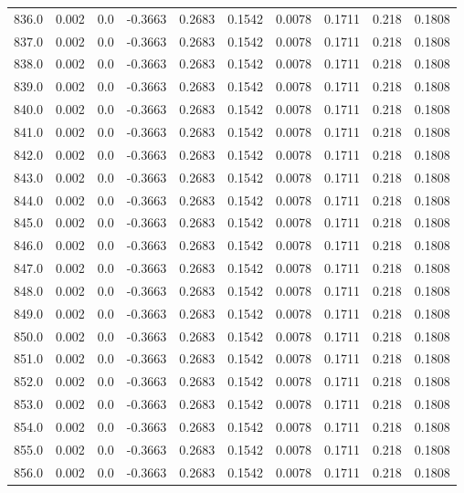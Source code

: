 \begin{longtable}{lrrrrrrrrr}
836.0 & 0.002 & 0.0 & -0.3663 & 0.2683 & 0.1542 & 0.0078 & 0.1711 & 0.218 & 0.1808 \\
837.0 & 0.002 & 0.0 & -0.3663 & 0.2683 & 0.1542 & 0.0078 & 0.1711 & 0.218 & 0.1808 \\
838.0 & 0.002 & 0.0 & -0.3663 & 0.2683 & 0.1542 & 0.0078 & 0.1711 & 0.218 & 0.1808 \\
839.0 & 0.002 & 0.0 & -0.3663 & 0.2683 & 0.1542 & 0.0078 & 0.1711 & 0.218 & 0.1808 \\
840.0 & 0.002 & 0.0 & -0.3663 & 0.2683 & 0.1542 & 0.0078 & 0.1711 & 0.218 & 0.1808 \\
841.0 & 0.002 & 0.0 & -0.3663 & 0.2683 & 0.1542 & 0.0078 & 0.1711 & 0.218 & 0.1808 \\
842.0 & 0.002 & 0.0 & -0.3663 & 0.2683 & 0.1542 & 0.0078 & 0.1711 & 0.218 & 0.1808 \\
843.0 & 0.002 & 0.0 & -0.3663 & 0.2683 & 0.1542 & 0.0078 & 0.1711 & 0.218 & 0.1808 \\
844.0 & 0.002 & 0.0 & -0.3663 & 0.2683 & 0.1542 & 0.0078 & 0.1711 & 0.218 & 0.1808 \\
845.0 & 0.002 & 0.0 & -0.3663 & 0.2683 & 0.1542 & 0.0078 & 0.1711 & 0.218 & 0.1808 \\
846.0 & 0.002 & 0.0 & -0.3663 & 0.2683 & 0.1542 & 0.0078 & 0.1711 & 0.218 & 0.1808 \\
847.0 & 0.002 & 0.0 & -0.3663 & 0.2683 & 0.1542 & 0.0078 & 0.1711 & 0.218 & 0.1808 \\
848.0 & 0.002 & 0.0 & -0.3663 & 0.2683 & 0.1542 & 0.0078 & 0.1711 & 0.218 & 0.1808 \\
849.0 & 0.002 & 0.0 & -0.3663 & 0.2683 & 0.1542 & 0.0078 & 0.1711 & 0.218 & 0.1808 \\
850.0 & 0.002 & 0.0 & -0.3663 & 0.2683 & 0.1542 & 0.0078 & 0.1711 & 0.218 & 0.1808 \\
851.0 & 0.002 & 0.0 & -0.3663 & 0.2683 & 0.1542 & 0.0078 & 0.1711 & 0.218 & 0.1808 \\
852.0 & 0.002 & 0.0 & -0.3663 & 0.2683 & 0.1542 & 0.0078 & 0.1711 & 0.218 & 0.1808 \\
853.0 & 0.002 & 0.0 & -0.3663 & 0.2683 & 0.1542 & 0.0078 & 0.1711 & 0.218 & 0.1808 \\
854.0 & 0.002 & 0.0 & -0.3663 & 0.2683 & 0.1542 & 0.0078 & 0.1711 & 0.218 & 0.1808 \\
855.0 & 0.002 & 0.0 & -0.3663 & 0.2683 & 0.1542 & 0.0078 & 0.1711 & 0.218 & 0.1808 \\
856.0 & 0.002 & 0.0 & -0.3663 & 0.2683 & 0.1542 & 0.0078 & 0.1711 & 0.218 & 0.1808 \\

\end{longtable}
